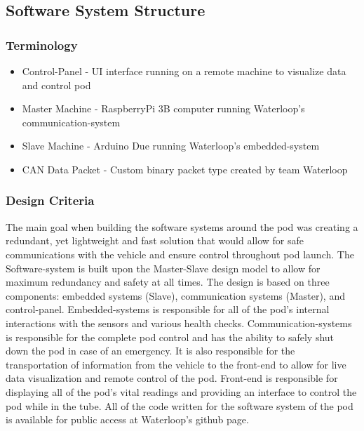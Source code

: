 \documentclass[main.tex]{subfiles}
\begin{document}
    \subsection{Software System Structure}
    \subsubsection{Terminology}
    \begin{itemize}
        \item Control-Panel - UI interface running on a remote machine to visualize data and control pod
        \item Master Machine - RaspberryPi 3B computer running Waterloop’s communication-system
        \item Slave Machine - Arduino Due running Waterloop’s embedded-system
        \item CAN Data Packet - Custom binary packet type created by team Waterloop
    \end{itemize}
    \subsubsection{Design Criteria}
    The main goal  when building the software systems around the pod was creating a redundant, yet lightweight and fast solution that would allow for safe communications with the vehicle and ensure control throughout pod launch. The Software-system is built upon the Master-Slave design model to allow for maximum redundancy and safety at all times. The design is based on three components: embedded systems (Slave), communication systems (Master), and control-panel. Embedded-systems is responsible for all of the pod’s internal interactions with the sensors and various health checks. Communication-systems is responsible for the complete pod control and has the ability to safely shut down the pod in case of an emergency. It is also responsible for the transportation of information from the vehicle to the front-end to allow for live data visualization and remote control of the pod. Front-end is responsible for displaying all of the pod’s vital readings and providing an interface to control the pod while in the tube. All of the code written for the software system of the pod is available for public access at Waterloop’s github page.
\end{document}
